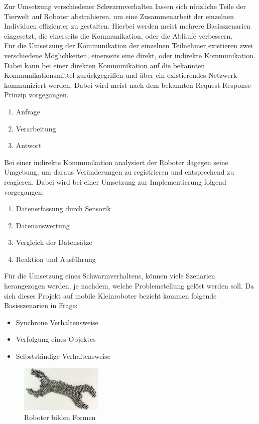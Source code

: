 Zur Umsetzung verschiedener Schwarmverhalten lassen sich nützliche Teile der Tierwelt auf Roboter abstrahieren, um eine Zusammenarbeit der einzelnen Individuen effizienter zu gestalten. Hierbei werden meist mehrere Basisszenarien eingesetzt, die einerseits die Kommunikation, oder die Abläufe verbessern.\\
Für die Umsetzung der Kommunikation der einzelnen Teilnehmer existieren zwei verschiedene Möglichkeiten, einerseits eine direkt, oder indirekte Kommunikation. Dabei kann bei einer direkten Kommunikation auf die bekannten Kommunikationsmittel zurückgegriffen und über ein existierendes Netzwerk kommuniziert werden. Dabei wird meist nach dem bekannten Request-Response-Prinzip vorgegangen.
\begin{enumerate}
	\item Anfrage
	\item Verarbeitung
	\item Antwort
\end{enumerate}
Bei einer indirekte Kommunikation analysiert der Roboter dagegen seine Umgebung, um daraus Veränderungen zu registrieren und entsprechend zu reagieren. Dabei wird bei einer Umsetzung zur Implementierung folgend vorgegangen:
\begin{enumerate}
	\item Datenerfassung durch Sensorik
	\item Datenauswertung
	\item Vergleich der Datensätze
	\item Reaktion und Ausführung
\end{enumerate}
Für die Umsetzung eines Schwarmverhaltens, können viele Szenarien herangezogen werden, je nachdem, welche Problemstellung gelöst werden soll. Da sich dieses Projekt auf mobile Kleinroboter bezieht kommen folgende Basisszenarien in Frage:
\begin{itemize}
	\item Synchrone Verhaltensweise
	\item Verfolgung eines Objektes
	\item Selbstständige Verhaltensweise
\end{itemize}

\begin{figure}
	\begin{center}
		\includegraphics[width=0.35\textwidth]{images/technische_grundlagen/roboterform.jpg}
	\end{center}
	\caption{Roboter bilden Formen \cite{FrankfurterAllgemeineZeitungGmbH.Schwarmverhalten:Roboter}}
	\label{fig:roboterFormen}
\end{figure}

